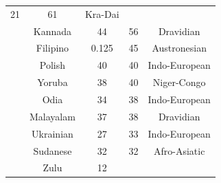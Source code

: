 \begin{center}
{\begin{tabular}{|c|c|c|c|c|}
21 &
	

61 &
	

Kra-Dai \\
	\thetablecount\stepcounter{tablecount} &

Kannada &
	

44 &
	

56 &
	

Dravidian \\

	\thetablecount\stepcounter{tablecount} &
Filipino &
	

0.125 &
	

45 &
	

Austronesian \\

	\thetablecount\stepcounter{tablecount} &
Polish &
	

40 &
	

40 &
	

Indo-European \\
	\thetablecount\stepcounter{tablecount} &

Yoruba &
	

38 &
	

40 &
	

Niger-Congo \\
	\thetablecount\stepcounter{tablecount} &

Odia &
	

34 &
	

38 &
	

Indo-European \\

	\thetablecount\stepcounter{tablecount} &
Malayalam &
	

37 &
	

38 &
	

Dravidian \\
	\thetablecount\stepcounter{tablecount} &

Ukrainian &
	

27 &
	

33 &
	

Indo-European \\
	\thetablecount\stepcounter{tablecount} &

Sudanese &
	

32 &
	

32 &
	

Afro-Asiatic \\
	\thetablecount\stepcounter{tablecount} &

Zulu &
	

12 &
	


\end{tabular}}
\end{center}
